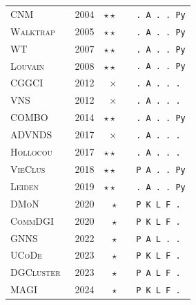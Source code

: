 \documentclass[../paper.tex]{subfiles}
\begin{document}
\begin{table}
\begin{tabular}{lrrlp{2cm}}
        \midrule
        \textsc{CNM}~\cite{cnm2004}                & 2004 & $\star\star$ & \cite{cdlib2019}     & \texttt{. A . . Py} \\
        \textsc{Walktrap}~\cite{walktrap2005}      & 2005 & $\star\star$ & \cite{igraph2006}    & \texttt{. A . . Py} \\
        \textsc{WT}~\cite{wt2007}                  & 2007 & $\star\star$ & \cite{igraph2006}    & \texttt{. A . . Py} \\
        \textsc{Louvain}~\cite{louvain2008}        & 2008 & $\star\star$ & \cite{igraph2006}    & \texttt{. A . . Py} \\
        \textsc{CGGCI}~\cite{cggci_rg2012}         & 2012 & $\times$     &                      & \texttt{. A . . .}  \\
        \textsc{VNS}~\cite{vns2012}                & 2012 & $\times$     &                      & \texttt{. A . . .}  \\
        \textsc{COMBO}~\cite{combo2014}            & 2014 & $\star\star$ & \cite{comboRepo}     & \texttt{. A . . Py} \\
        \textsc{ADVNDS}~\cite{advnds2019}          & 2017 & $\times$     &                      & \texttt{. A . . .}  \\
        \textsc{Hollocou}~\cite{hollocou2017}      & 2017 & $\star\star$ & \cite{hollocouRepo}  & \texttt{. A . . .}  \\
        \textsc{VieClus}~\cite{vieclus2018}        & 2018 & $\star\star$ & \cite{vieclusRepo}   & \texttt{P A . . Py}  \\
        \textsc{Leiden}~\cite{leiden2019}          & 2019 & $\star\star$ & \cite{igraph2006}    & \texttt{. A . . Py} \\
        \textsc{DMoN}~\cite{dmon2023}              & 2020 & $\star$      & \cite{dmonRepo}      & \texttt{P K L F .}  \\
        \textsc{CommDGI}~\cite{commdgi2020}        & 2020 & $\star$      & \cite{commdgiRepo}   & \texttt{P K L F .}  \\
        \textsc{GNNS}~\cite{gnns2022}              & 2022 & $\star$      & \cite{gnnsRepo}      & \texttt{P A L . .}  \\
        \textsc{UCoDe}~\cite{ucode2023}            & 2023 & $\star$      & \cite{ucodeRepo}     & \texttt{P K L F .}  \\
        \textsc{DGCluster}~\cite{dgcluster2024}    & 2023 & $\star$      & \cite{dgclusterRepo} & \texttt{P A L F .}  \\
        \textsc{MAGI}~\cite{magi2024}              & 2024 & $\star$      & \cite{magiRepo}      & \texttt{P K L F .}  \\

\end{tabular}
\end{table}
\end{document}
